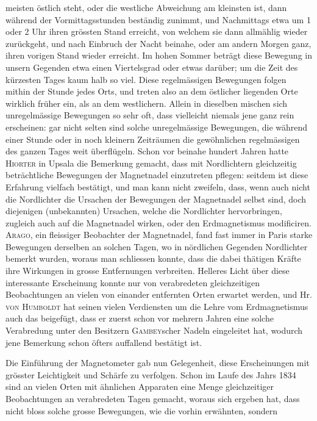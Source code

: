\noindent meisten östlich steht, oder die westliche Abweichung am kleinsten ist, dann während der Vormittagsstunden beständig zunimmt, und Nachmittags etwa um 1 oder 2 Uhr ihren grössten Stand erreicht, von welchem sie dann allmählig wieder zurückgeht, und nach Einbruch der Nacht beinahe, oder am andern Morgen ganz, ihren vorigen Stand wieder erreicht. Im hohen Sommer beträgt diese Bewegung in unsern Gegenden etwa einen Viertelsgrad oder etwas darüber; um die Zeit des kürzesten Tages kaum halb so viel. Diese regelmässigen Bewegungen folgen mithin der Stunde jedes Orts, und treten also an dem östlicher liegenden Orte wirklich früher ein, als an dem westlichern. Allein in dieselben mischen sich unregelmässige Bewegungen so sehr oft, dass vielleicht niemals jene ganz rein erscheinen: gar nicht selten sind solche unregelmässige Bewegungen, die während einer Stunde oder in noch kleinern Zeiträumen die gewöhnlichen regelmässigen des ganzen Tages weit überflügeln. Schon vor beinahe hundert Jahren hatte \textsc{Hiorter} in Upsala die Bemerkung gemacht, dass mit Nordlichtern gleichzeitig beträchtliche Bewegungen der Magnetnadel einzutreten pflegen: seitdem ist diese Erfahrung vielfach bestätigt, und man kann nicht zweifeln, dass, wenn auch nicht die Nordlichter die Ursachen der Bewegungen der Magnetnadel selbst sind, doch diejenigen (unbekannten) Ursachen, welche die Nordlichter hervorbringen, zugleich auch auf die Magnetnadel wirken, oder den Erdmagnetismus modificiren. \textsc{Arago}, ein fleissiger Beobachter der Magnetnadel, fand fast immer in Paris starke Bewegungen derselben an solchen Tagen, wo in nördlichen Gegenden Nordlichter bemerkt wurden, woraus man schliessen konnte, dass die dabei thätigen Kräfte ihre Wirkungen in grosse Entfernungen verbreiten. Helleres Licht über diese interessante Erscheinung konnte nur von verabredeten gleichzeitigen Beobachtungen an vielen von einander entfernten Orten erwartet werden, und Hr. \textsc{von Humboldt} hat seinen vielen Verdiensten um die Lehre vom Erdmagnetismus auch das beigefügt, dass er zuerst schon vor mehrern Jahren eine solche Verabredung unter den Besitzern \textsc{Gambey}scher Nadeln eingeleitet hat, wodurch jene Bemerkung schon öfters auffallend bestätigt ist.

Die Einführung der Magnetometer gab nun Gelegenheit, diese Erscheinungen mit grösster Leichtigkeit und Schärfe zu verfolgen. Schon im Laufe des Jahrs 1834 sind an vielen Orten mit ähnlichen Apparaten eine Menge gleichzeitiger Beobachtungen an verabredeten Tagen gemacht, woraus sich ergeben hat, dass nicht bloss solche grosse Bewegungen, wie die vorhin erwähnten, sondern
